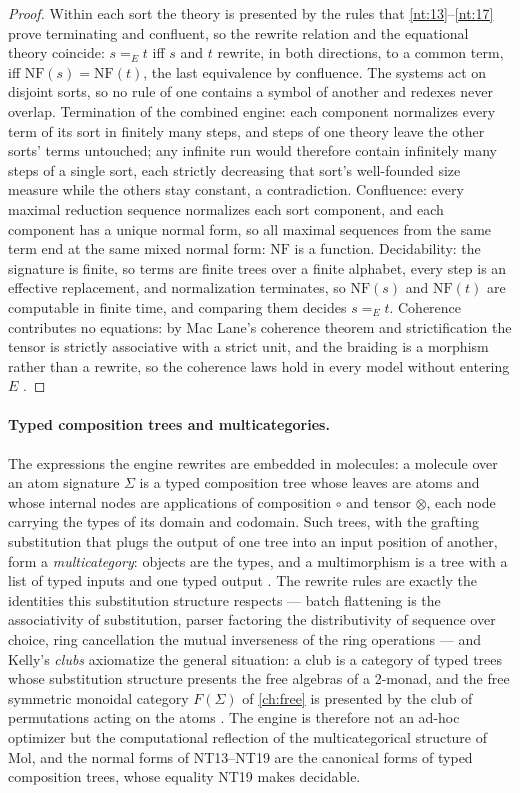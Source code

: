 \begin{proof}
Within each sort the theory is presented by the rules that
\autoref{nt:13}--\autoref{nt:17} prove terminating and confluent, so the
rewrite relation and the equational theory coincide: $s =_E t$ iff $s$ and
$t$ rewrite, in both directions, to a common term, iff $\mathrm{NF}(s) =
\mathrm{NF}(t)$, the last equivalence by confluence. The systems act on
disjoint sorts, so no rule of one contains a symbol of another and redexes
never overlap. Termination of the combined engine: each component
normalizes every term of its sort in finitely many steps, and steps of one
theory leave the other sorts' terms untouched; any infinite run would
therefore contain infinitely many steps of a single sort, each strictly
decreasing that sort's well-founded size measure while the others stay
constant, a contradiction. Confluence: every maximal reduction sequence
normalizes each sort component, and each component has a unique normal
form, so all maximal sequences from the same term end at the same mixed
normal form: $\mathrm{NF}$ is a function. Decidability: the signature is
finite, so terms are finite trees over a finite alphabet, every step is an
effective replacement, and normalization terminates, so $\mathrm{NF}(s)$
and $\mathrm{NF}(t)$ are computable in finite time, and comparing them
decides $s =_E t$. Coherence contributes no equations: by Mac Lane's
coherence theorem and strictification the tensor is strictly associative
with a strict unit, and the braiding is a morphism rather than a rewrite,
so the coherence laws hold in every model without entering $E$
\cite{maclane}.
\end{proof}

\paragraph{Typed composition trees and multicategories.}
The expressions the engine rewrites are embedded in molecules: a molecule
over an atom signature $\Sigma$ is a typed composition tree whose leaves
are atoms and whose internal nodes are applications of composition $\circ$
and tensor $\otimes$, each node carrying the types of its domain and
codomain. Such trees, with the grafting substitution that plugs the output
of one tree into an input position of another, form a \emph{multicategory}:
objects are the types, and a multimorphism is a tree with a list of typed
inputs and one typed output \cite{leinster}. The rewrite rules are exactly
the identities this substitution structure respects --- batch flattening is
the associativity of substitution, parser factoring the distributivity of
sequence over choice, ring cancellation the mutual inverseness of the ring
operations --- and Kelly's \emph{clubs} axiomatize the general situation: a
club is a category of typed trees whose substitution structure presents the
free algebras of a 2-monad, and the free symmetric monoidal category
$F(\Sigma)$ of \autoref{ch:free} is presented by the club of permutations
acting on the atoms \cite{kelly, leinster}. The engine is therefore not an
ad-hoc optimizer but the computational reflection of the multicategorical
structure of Mol, and the normal forms of NT13--NT19 are the canonical
forms of typed composition trees, whose equality NT19 makes decidable.
